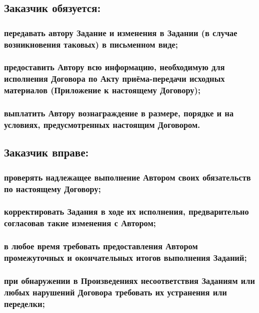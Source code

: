 \documentclass[12pt]{article}
\begin{document}
\subsection{Заказчик обязуется:}

\subsubsection{передавать автору Задание и изменения в Задании (в случае возникновения таковых) в письменном виде;}

\subsubsection{предоставить Автору всю информацию, необходимую для исполнения Договора по Акту приёма-передачи исходных материалов (Приложение  к настоящему Договору);}

\subsubsection{выплатить Автору вознаграждение в размере, порядке и на условиях, предусмотренных настоящим Договором.}

\subsection{Заказчик вправе:}

\subsubsection{проверять надлежащее выполнение Автором своих обязательств по настоящему Договору;}

\subsubsection{корректировать Задания в ходе их исполнения, предварительно согласовав такие изменения с Автором;}

\subsubsection{в любое время требовать предоставления Автором промежуточных и окончательных итогов выполнения Заданий;}

\subsubsection{при обнаружении в Произведениях несоответствия Заданиям или любых нарушений Договора требовать их устранения или переделки;}
\end{document}
